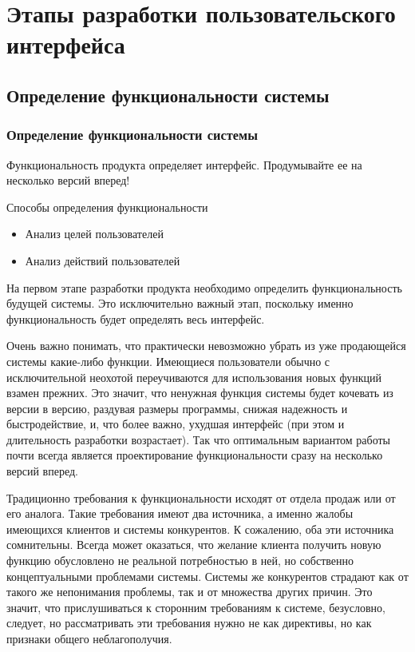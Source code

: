 \documentclass{../industrial-development}
\begin{document}
\section{Этапы разработки пользовательского интерфейса}

\subsection{Определение функциональности системы}

\begin{frame} \frametitle{Определение функциональности системы}

  \begin{block}{}
    Функциональность продукта определяет интерфейс. Продумывайте ее на несколько версий вперед!
  \end{block}
  
  \begin{block}{Способы определения функциональности}
    \begin{itemize}
    \item Анализ целей пользователей
    \item Анализ действий пользователей
    \end{itemize}
  \end{block}
\end{frame}

\lecturenotes

На первом этапе разработки продукта необходимо определить функциональность будущей системы. Это исключительно важный этап, поскольку именно функциональность будет определять весь интерфейс.

Очень важно понимать, что практически невозможно убрать из уже продающейся системы какие-либо функции. Имеющиеся пользователи обычно с исключительной неохотой переучиваются для использования новых функций взамен прежних. Это значит, что ненужная функция системы будет кочевать из версии в версию, раздувая размеры программы, снижая надежность и быстродействие, и, что более важно, ухудшая интерфейс (при этом и длительность разработки возрастает). Так что оптимальным вариантом работы почти всегда является проектирование функциональности сразу на несколько версий вперед.

Традиционно требования к функциональности исходят от отдела продаж или от его аналога. Такие требования имеют два источника, а именно жалобы имеющихся клиентов и системы конкурентов. К сожалению, оба эти источника сомнительны. Всегда может оказаться, что желание клиента получить новую функцию обусловлено не реальной потребностью в ней, но собственно концептуальными проблемами системы. Системы же конкурентов страдают как от такого же непонимания проблемы, так и от множества других причин. Это значит, что прислушиваться к сторонним требованиям к системе, безусловно, следует, но рассматривать эти требования нужно не как директивы, но как признаки общего неблагополучия.
\end{document}
